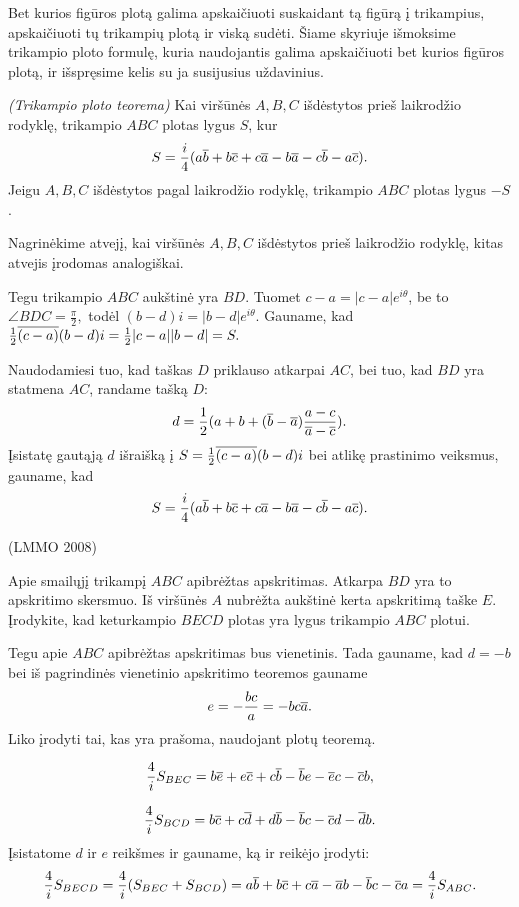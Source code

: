 \documentclass[11pt,a4paper,twoside]{book}
\begin{document}
Bet kurios figūros plotą galima apskaičiuoti suskaidant tą figūrą į trikampius, apskaičiuoti tų trikampių plotą ir viską sudėti. Šiame skyriuje išmoksime trikampio ploto formulę, kuria naudojantis galima apskaičiuoti bet kurios figūros plotą, ir išspręsime kelis su ja susijusius uždavinius.

\begin{thmnr} \textit{(Trikampio ploto teorema)}
Kai viršūnės $A, B, C$ išdėstytos prieš laikrodžio rodyklę, trikampio $ABC$ plotas lygus $S$, kur 
$$S=\frac{i}{4}(a\overline{b} +b\overline{c}+c\overline{a} - b\overline{a} -c\overline{b}-a\overline{c}).$$
Jeigu $A, B, C$ išdėstytos pagal laikrodžio rodyklę, trikampio $ABC$ plotas lygus $-S$.
\end{thmnr}

\begin{sprendimas}
Nagrinėkime atvejį, kai viršūnės $A, B, C$ išdėstytos prieš laikrodžio rodyklę, kitas atvejis įrodomas analogiškai.

Tegu trikampio $ABC$ aukštinė yra $BD$. Tuomet $c-a=|c-a|e^{i\theta}$, be to $\angle BDC = \frac {\pi}{2},$ todėl $(b-d)i=|b-d|e^{i\theta}$. Gauname, kad $\frac{1}{2}\overline{(c-a)} (b-d)i=\frac{1}{2}|c-a||b-d|=S.$

Naudodamiesi tuo, kad taškas $D$ priklauso atkarpai $AC$, bei tuo, kad $BD$ yra statmena $AC$, randame tašką $D$:
$$ d =\frac {1}{2}(a+b + (\overline{b}-\overline{a}) \frac{a-c}{ \overline{a}-\overline{c}}).$$
Įsistatę gautąją $d$ išraišką į $S=\frac{1}{2}\overline{(c-a)} (b-d)i$ bei atlikę prastinimo veiksmus, gauname, kad
$$S= \frac {i}{4}(a\overline{b}+ b \overline{c} + c \overline{a} - b\overline{a} - c \overline{b} - a \overline{c}).$$
\end{sprendimas}



\begin{pavnr}
(LMMO 2008)

Apie smailųjį trikampį $ABC$ apibrėžtas apskritimas. Atkarpa $BD$ yra to
apskritimo skersmuo. Iš viršūnės $A$ nubrėžta aukštinė kerta apskritimą
taške $E$. Įrodykite, kad keturkampio $BECD$ plotas yra lygus trikampio
$ABC$ plotui.
\end{pavnr}
\begin{sprendimas}
Tegu apie $ABC$ apibrėžtas apskritimas bus vienetinis. Tada gauname, kad $d = -b$ bei iš pagrindinės vienetinio apskritimo teoremos gauname
 $$ e= -\frac {bc}{a}= -bc \overline{a}.$$
Liko įrodyti tai, kas yra prašoma, naudojant plotų teoremą.

$$\frac{4}{i}S_{BEC}=b\overline{e}+e\overline{c}+c\overline{b}-\overline{b}e-\overline{e}c-\overline{c}b,$$

$$\frac{4}{i}S_{BCD}=b\overline{c}+c\overline{d}+d\overline{b}-\overline{b}c-\overline{c}d-\overline{d}b.$$
Įsistatome $d$ ir $e$ reikšmes ir gauname, ką ir reikėjo įrodyti:
$$ \frac{4}{i}S_{BECD}=\frac{4}{i}(S_{BEC}+S_{BCD})=   
a\overline b + b \overline c + c \overline a - \overline a b - \overline b c - \overline c a = \frac{4}{i}S_{ABC}.$$
\end{sprendimas}
\end{document}
